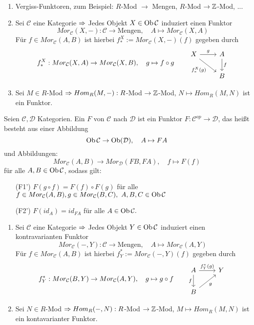 \begin{bsp}
	\begin{enumerate} [label= \alph*)]
		\item Vergiss-Funktoren, zum Beispiel: $R$-Mod $\to $ Mengen, $R$-Mod $\to \mathbb{Z}$-Mod, ...
		\item Sei $\mathcal{C}$ eine Kategorie $\Rightarrow$ Jedes Objekt $X \in \text{Ob}\,\mathcal{C}$ induziert einen Funktor $$Mor_{\mathcal{C}}(X,-): \mathcal{C} \to \text{Mengen}, \quad A \mapsto Mor_{\mathcal{C}}(X,A) $$
		Für $f \in Mor_{\mathcal{C}}(A,B) $ ist hierbei $f_{\ast}^{X} := Mor_{\mathcal{C}}(X,-)(f)$ gegeben durch $$ f_{\ast}^{X}: Mor_{\mathcal{C}}(X,A) \to Mor_{\mathcal{C}}(X,B), \quad g \mapsto f \circ g\qquad \begin{tikzcd}
		X \arrow{r}{g} \arrow[swap]{rd}{f_*^X(g)} & A \arrow{d}{f} \\ & B
		\end{tikzcd} $$
		\item Sei $M \in R$-Mod $\Rightarrow Hom_R(M,-): R$-Mod $\to \mathbb{Z}$-Mod, $N \mapsto Hom_R(M,N) $ ist ein Funktor.
	\end{enumerate}
\end{bsp}
\begin{df}\label{4.6}
	Seien $\mathcal{C}, \mathcal{D}$ Kategorien. Ein  $F$ von $\mathcal{C}$ nach $\mathcal{D}$ ist ein Funktor $F: \mathcal{C}^{op} \to \mathcal{D} $, das heißt besteht aus einer Abbildung $$ \text{Ob}\,\mathcal{C} \to \text{Ob}(\mathcal{D}), \quad A \mapsto FA$$
	und Abbildungen: $$ Mor_{\mathcal{C}}(A,B) \to Mor_{\mathcal{D}}(FB,FA), \quad f \mapsto F(f) $$ für alle $A,B \in \text{Ob}\,\mathcal{C}$, sodass gilt:
	\begin{enumerate}
		\item[(F1')] $F(g \circ f) = F(f) \circ F(g) $ für alle $ f \in Mor_{\mathcal{C}}(A,B), g\in Mor_{\mathcal{C}}(B,C), \ A,B,C \in \text{Ob}\,\mathcal{C}$
		\item[(F2')] $F(id_A) =id_{FA} $ für alle $A \in \text{Ob}\,\mathcal{C}.$
	\end{enumerate}
\end{df}
\begin{bsp}
		\begin{enumerate} [label= \alph*)]
		\item Sei $\mathcal{C}$ eine Kategorie $\Rightarrow$ Jedes Objekt $Y \in \text{Ob}\,\mathcal{C}$ induziert einen kontravarianten Funktor $$Mor_{\mathcal{C}}(-,Y): \mathcal{C} \to \text{Mengen}, \quad A \mapsto Mor_{\mathcal{C}}(A,Y) $$
		Für $f \in Mor_{\mathcal{C}}(A,B) $ ist hierbei $f_{Y}^{\ast} := Mor_{\mathcal{C}}(-,Y)(f)$ gegeben durch $$ f_{Y}^{\ast}: Mor_{\mathcal{C}}(B,Y) \to Mor_{\mathcal{C}}(A,Y), \quad g \mapsto g \circ f\qquad \begin{tikzcd}
		A \arrow{r}{f_Y^*(g)} \arrow[swap]{d}{f} & Y \\B \arrow[swap]{ur}{g}
		\end{tikzcd}$$
		\item Sei $N \in R$-Mod $\Rightarrow Hom_R(-,N): R$-Mod $\to \mathbb{Z}$-Mod, $M \mapsto Hom_R(M,N) $ ist ein kontavarianter Funktor.
	\end{enumerate}
\end{bsp}
